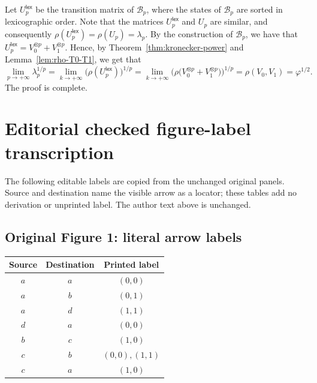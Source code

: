 \documentclass[11pt]{article}
\theoremstyle{remark}\newtheorem{remark}[theorem]{Remark}
\begin{document}
Let $U_p^{\textsf{lex}}$ be the transition matrix of $\mathcal{B}_p$, where the states of $\mathcal{B}_p$ are sorted in lexicographic order.
Note that the matrices $U_p^{\textsf{lex}}$ and $U_p$ are similar, and  consequently $\rho(U_p^{\textsf{lex}}) = \rho(U_p) = \lambda_p$.
By the construction of $\mathcal{B}_p$, we have that $U_p^{\textsf{lex}} = V_0^{\otimes p} + V_1^{\otimes p}$.
Hence, by Theorem~\ref{thm:kronecker-power} and Lemma~\ref{lem:rho-T0-T1}, we get that
\begin{equation*}
	\lim_{p \to +\infty} \lambda_p^{1/p} = \lim_{k \to +\infty} \big(\rho(U_p^{\textsf{lex}})\big)^{1/p} = \lim_{k \to +\infty} \Big(\rho\big(V_0^{\otimes p} + V_1^{\otimes p}\big)\Big)^{1/p} = \rho(V_0, V_1) = \varphi^{1/2} .
\end{equation*}
The proof is complete.
\section*{Editorial checked figure-label transcription}
The following editable labels are copied from the unchanged original panels. Source and destination name the visible arrow as a locator; these tables add no derivation or unprinted label. The author text above is unchanged.
\subsection*{Original Figure 1: literal arrow labels}
\begin{center}\begin{tabular}{ccc}\toprule Source&Destination&Printed label\\\midrule
$a$&$a$&$(0,0)$\\
$a$&$b$&$(0,1)$\\
$a$&$d$&$(1,1)$\\
$d$&$a$&$(0,0)$\\
$b$&$c$&$(1,0)$\\
$c$&$b$&$(0,0), (1,1)$\\
$c$&$a$&$(1,0)$\\
\bottomrule\end{tabular}\end{center}
\end{document}

